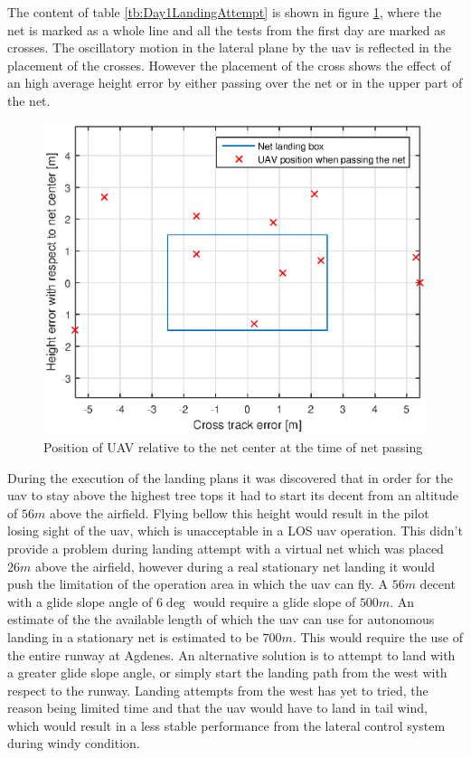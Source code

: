 The content of table \ref{tb:Day1LandingAttempt} is shown in figure \ref{Fig:Day1NetPass}, where the net is marked as a whole line and all the tests from the first day are marked as crosses. The oscillatory motion in the lateral plane by the \gls{uav} is reflected in the placement of the crosses. However the placement of the cross shows the effect of an high average height error by either passing over the net or in the upper part of the net.
\begin{figure}[H]
\centering
\includegraphics[scale=0.7]{figs/Experiment/day1NetHit.eps}
\caption{Position of UAV relative to the net center at the time of net passing}
\label{Fig:Day1NetPass}
\end{figure}
During the execution of the landing plans it was discovered that in order for the \gls{uav} to stay above the highest tree tops it had to start its decent from an altitude of $56 m$ above the airfield. Flying bellow this height would result in the pilot losing sight of the \gls{uav}, which is unacceptable in a LOS \gls{uav} operation. This didn't provide a problem during landing attempt with a virtual net which was placed $26 m$ above the airfield, however during a real stationary net landing it would push the limitation of the operation area in which the \gls{uav} can fly. A $56 m $ decent with a glide slope angle of $6\deg$ would require a glide slope of $500 m$. An estimate of the the available length of which the \gls{uav} can use for autonomous landing in a stationary net is estimated to be $700 m$. This would require the use of the entire runway at Agdenes. An alternative solution is to attempt to land with a greater glide slope angle, or simply start the landing path from the west with respect to the runway. Landing attempts from the west has yet to tried, the reason being limited time and that the \gls{uav} would have to land in tail wind, which would result in a less stable performance from the lateral control system during windy condition.
